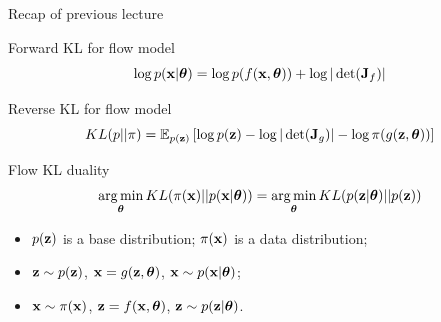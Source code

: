 \begin{frame}{Recap of previous lecture}
	\begin{block}{Forward KL for flow model}
	  	\vspace{-0.1cm}
		\[
			\log p(\mathbf{x}|\boldsymbol{\theta}) = \log p(f(\mathbf{x}, \boldsymbol{\theta})) + \log  |\det (\mathbf{J}_f)|
		\]
		\vspace{-0.3cm}
	\end{block}
	\begin{block}{Reverse KL for flow model}
  		\vspace{-0.5cm}
		\[
			KL(p || \pi)  = \mathbb{E}_{p(\mathbf{z})} \left[  \log p(\mathbf{z}) -  \log |\det (\mathbf{J}_g)| - \log \pi(g(\mathbf{z}, \boldsymbol{\theta})) \right]
		\]
		\vspace{-0.5cm}
	\end{block}
	\begin{block}{Flow KL duality}
	  	\vspace{-0.3cm}
		\[
			\operatorname*{arg\,min}_{\boldsymbol{\theta}} KL(\pi(\mathbf{x}) || p(\mathbf{x} | \boldsymbol{\theta})) = \operatorname*{arg\,min}_{\boldsymbol{\theta}} KL(p(\mathbf{z} | \boldsymbol{\theta}) || p(\mathbf{z}))
		\]
		\vspace{-0.3cm}
		\begin{itemize}
			\item $p(\mathbf{z})$ is a base distribution; $\pi(\mathbf{x})$ is a data distribution;
			\item $\mathbf{z} \sim p(\mathbf{z})$, $\mathbf{x} = g(\mathbf{z}, \boldsymbol{\theta})$, $\mathbf{x} \sim p(\mathbf{x}| \boldsymbol{\theta})$;
			\item $\mathbf{x} \sim \pi(\mathbf{x})$, $\mathbf{z} = f(\mathbf{x}, \boldsymbol{\theta})$, $\mathbf{z} \sim p(\mathbf{z} | \boldsymbol{\theta})$.
		\end{itemize}
	\end{block}
\end{frame}
